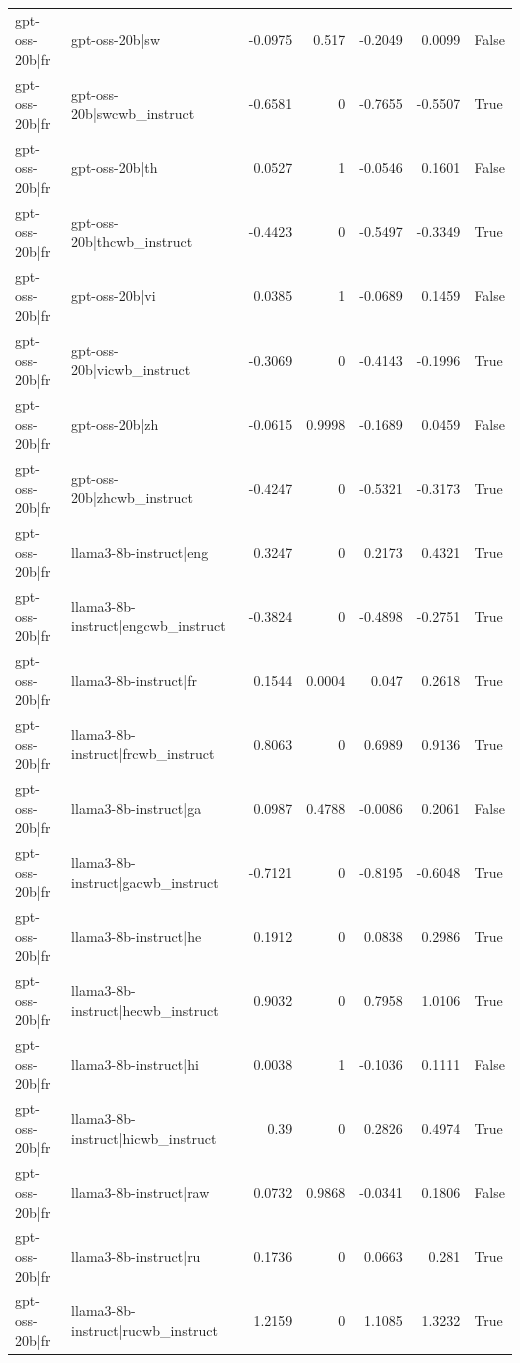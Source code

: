 \begin{table}
\begin{tabular}{l l r r r r l}
gpt-oss-20b|fr & gpt-oss-20b|sw & -0.0975 & 0.517 & -0.2049 & 0.0099 & False \\
gpt-oss-20b|fr & gpt-oss-20b|swcwb_instruct & -0.6581 & 0 & -0.7655 & -0.5507 & True \\
gpt-oss-20b|fr & gpt-oss-20b|th & 0.0527 & 1 & -0.0546 & 0.1601 & False \\
gpt-oss-20b|fr & gpt-oss-20b|thcwb_instruct & -0.4423 & 0 & -0.5497 & -0.3349 & True \\
gpt-oss-20b|fr & gpt-oss-20b|vi & 0.0385 & 1 & -0.0689 & 0.1459 & False \\
gpt-oss-20b|fr & gpt-oss-20b|vicwb_instruct & -0.3069 & 0 & -0.4143 & -0.1996 & True \\
gpt-oss-20b|fr & gpt-oss-20b|zh & -0.0615 & 0.9998 & -0.1689 & 0.0459 & False \\
gpt-oss-20b|fr & gpt-oss-20b|zhcwb_instruct & -0.4247 & 0 & -0.5321 & -0.3173 & True \\
gpt-oss-20b|fr & llama3-8b-instruct|eng & 0.3247 & 0 & 0.2173 & 0.4321 & True \\
gpt-oss-20b|fr & llama3-8b-instruct|engcwb_instruct & -0.3824 & 0 & -0.4898 & -0.2751 & True \\
gpt-oss-20b|fr & llama3-8b-instruct|fr & 0.1544 & 0.0004 & 0.047 & 0.2618 & True \\
gpt-oss-20b|fr & llama3-8b-instruct|frcwb_instruct & 0.8063 & 0 & 0.6989 & 0.9136 & True \\
gpt-oss-20b|fr & llama3-8b-instruct|ga & 0.0987 & 0.4788 & -0.0086 & 0.2061 & False \\
gpt-oss-20b|fr & llama3-8b-instruct|gacwb_instruct & -0.7121 & 0 & -0.8195 & -0.6048 & True \\
gpt-oss-20b|fr & llama3-8b-instruct|he & 0.1912 & 0 & 0.0838 & 0.2986 & True \\
gpt-oss-20b|fr & llama3-8b-instruct|hecwb_instruct & 0.9032 & 0 & 0.7958 & 1.0106 & True \\
gpt-oss-20b|fr & llama3-8b-instruct|hi & 0.0038 & 1 & -0.1036 & 0.1111 & False \\
gpt-oss-20b|fr & llama3-8b-instruct|hicwb_instruct & 0.39 & 0 & 0.2826 & 0.4974 & True \\
gpt-oss-20b|fr & llama3-8b-instruct|raw & 0.0732 & 0.9868 & -0.0341 & 0.1806 & False \\
gpt-oss-20b|fr & llama3-8b-instruct|ru & 0.1736 & 0 & 0.0663 & 0.281 & True \\
gpt-oss-20b|fr & llama3-8b-instruct|rucwb_instruct & 1.2159 & 0 & 1.1085 & 1.3232 & True \\

\end{tabular}
\end{table}
